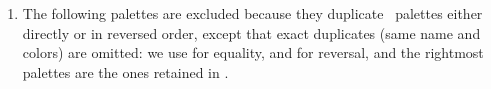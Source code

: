\documentclass{tutodoc}
\begin{document}

\begin{enumerate}
    \item The following palettes are excluded because they duplicate \thisproj\ palettes either directly or in reversed order, except that exact duplicates (same name and colors) are omitted: we use \boxed{{=}\vphantom{pM}} for equality, and \boxed{{\rightleftharpoons}\vphantom{pM}} for reversal, and the rightmost palettes are the ones retained in \thisproj.
\end{enumerate}

\end{document}
